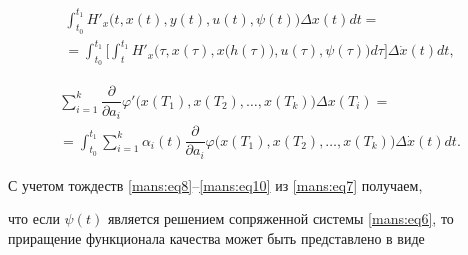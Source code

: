 \begin{multline}

 \int_{t_{0}}^{t_{1}} H'_{x} \bigl(t, x(t), y(t), u(t), \psi (t) \bigr) \Delta x(t) dt =

 \\ =

 \int_{t_{0}}^{t_{1}} \biggl[ \int_{t}^{t_{1}} H'_{x} \bigl(\tau, x(\tau), x \bigl(h(\tau)\bigr), u(\tau), \psi (\tau) \bigr) d\tau \biggr] \Delta \dot{x}(t) dt , 

 \label{mans:eq10}

\end{multline}

\begin{multline}

\sum_{i=1}^{k} \dfrac{\partial } {\partial a_{i}} \varphi' \bigl(x(T_{1}), x(T_{2}), \ldots, x(T_{k})\bigr) \Delta x(T_{i}) =

\\ 

=

\int_{t_{0}}^{t_{1}} \sum_{i=1}^{k} \alpha_{i} (t) \dfrac{\partial } {\partial a_{i}} 

\varphi \bigl(x(T_{1}), x(T_{2}), \ldots, x(T_{k})\bigr)

\Delta \dot{x}(t) dt .

\label{mans:eq10}

\end{multline}







С учетом тождеств \eqref{mans:eq8}--\eqref{mans:eq10} из \eqref{mans:eq7} получаем, 

что если  $ \psi (t) $  является решением сопряженной системы \eqref{mans:eq6}, то  приращение функционала качества может быть представлено в виде

